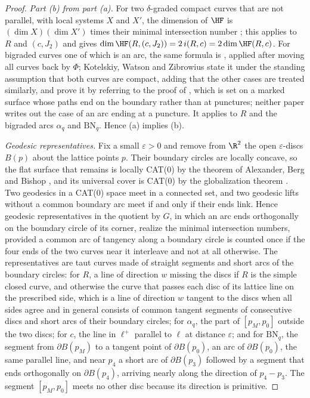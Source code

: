 \begin{proof}
\emph{Part (b) from part (a).}  For two $\delta$-graded compact curves that are not parallel, with
local systems $X$ and $X'$, the dimension of $\HF$ is $(\dim X)(\dim X')$ times their minimal
intersection number \cite[Thm.~4.45]{Zibrowius}; this applies to $R$ and $(c,J_2)$ and gives
$\dim\HF(R,(c,J_2))=2\,i(R,c)=2\dim\HF(R,c)$.  For bigraded curves one of which is an arc, the same
formula is \cite[Thm.~5.25]{KWZ}, applied after moving all curves back by $\Phi$; Kotelskiy, Watson
and Zibrowius state it under the standing assumption that both curves are compact, adding that the other
cases are treated similarly, and prove it by referring to the proof of \cite[Thm.~4.45]{Zibrowius}, which
is set on a marked surface whose paths end on the boundary rather than at punctures; neither paper writes
out the case of an arc ending at a puncture.  It applies to
$R$ and the bigraded arcs $\alpha_q$ and $\mathrm{BN}_q$.  Hence (a) implies (b).

\emph{Geodesic representatives.}  Fix a small $\varepsilon>0$ and remove from $\R^2$ the open
$\varepsilon$-discs $B(p)$ about the lattice points $p$.  Their boundary circles are locally
concave, so the flat surface that remains is locally CAT(0) by the theorem of Alexander, Berg and
Bishop \cite[Thm.~7.28]{AKP}, and its universal cover is CAT(0) by the globalization theorem
\cite[Thm.~5.6]{AKP}.  Two geodesics in a CAT(0) space meet in a connected set, and two geodesic lifts without a common boundary arc meet
if and only if their ends link.  Hence geodesic
representatives in the quotient by $G$, in which an arc ends orthogonally on the boundary circle of its corner,
realize the minimal intersection numbers, provided a common arc of tangency along a boundary circle
is counted once if the four ends of the two curves near it interleave and not at all otherwise.  The
representatives are taut curves made of straight segments and short arcs of the boundary circles: for
$R$, a line of direction $w$ missing the discs if $R$ is the simple closed curve, and otherwise the curve that
passes each disc of its lattice line on the prescribed side, which is a line of direction $w$ tangent to the
discs when all sides agree and in general consists of common tangent segments of consecutive discs and short
arcs of their boundary circles; for $\alpha_q$, the part of $[p_M,p_0]$ outside the two
discs; for $c$, the line in $\ell^+$ parallel to $\ell$ at distance $\varepsilon$; and for $\mathrm{BN}_q$, the
segment from $\partial B(p_M)$ to a tangent point of $\partial B(p_0)$, an arc of $\partial B(p_0)$, the same
parallel line, and near $p_4$ a short arc of $\partial B(p_3)$ followed by a segment that ends orthogonally on
$\partial B(p_4)$, arriving nearly along the direction of $p_4-p_3$.  The segment $[p_M,p_0]$ meets no other
disc because its direction is primitive.


\end{proof}
